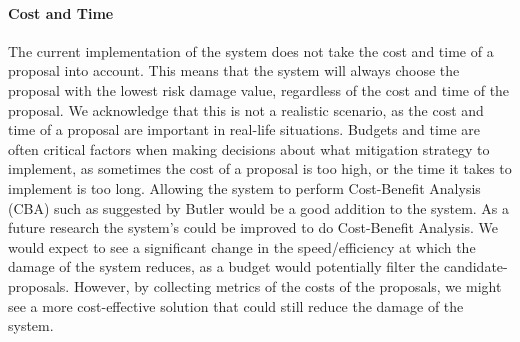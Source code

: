 \paragraph{Cost and Time}
The current implementation of the system does not take the cost and time of a proposal into account. This means that the system will always choose the proposal with the lowest risk damage value, regardless of the cost and time of the proposal. We acknowledge that this is not a realistic scenario, as the cost and time of a proposal are important in real-life situations. Budgets and time are often critical factors when making decisions about what mitigation strategy to implement, as sometimes the cost of a proposal is too high, or the time it takes to implement is too long. Allowing the system to perform Cost-Benefit Analysis (CBA) such as suggested by Butler \cite{butler2002security} would be a good addition to the system. As a future research the system's  could be improved to do Cost-Benefit Analysis. We would expect to see a significant change in the speed/efficiency at which the damage of the system reduces, as a budget would potentially filter the candidate-proposals. However, by collecting metrics of the costs of the proposals, we might see a more cost-effective solution that could still reduce the damage of the system.
